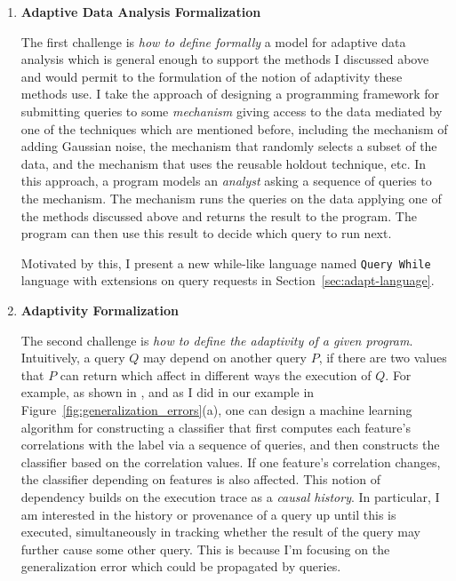 \begin{enumerate}
 \item
 \textbf{Adaptive Data Analysis Formalization}

The first challenge is \emph{how to define formally} a model for adaptive data analysis which is general enough to support the methods I discussed above and would permit to the formulation of the notion of adaptivity these methods use. 
I take the approach of designing a programming framework for submitting queries to some \emph{mechanism} giving access 
to the data mediated by one of the techniques which are mentioned before, 
including the mechanism of adding Gaussian noise, 
the mechanism that randomly selects a subset of the data, 
and the mechanism that uses the reusable holdout technique, etc. 
In this approach, a program models an \emph{analyst} asking a sequence of queries to the mechanism. 
The mechanism runs the queries on the data applying one of the methods discussed above and returns the result to the program. The program can then use this result to decide which query to run next. 

Motivated by this, I present a new while-like language 
named {\tt Query While} language with extensions on query requests in Section~\ref{sec:adapt-language}.

\item 
\textbf{Adaptivity Formalization}

The second challenge is \emph{how to define the adaptivity of a given program}.
Intuitively, a query $Q$ may depend on another query $P$, if there are two values that $P$ can return which affect in different ways the execution of $Q$. 
For example, as shown in \cite{stoc/DworkFHPRR15}, and as I did in our example in Figure~\ref{fig:generalization_errors}(a), one can design a machine learning algorithm for constructing a classifier that first computes each feature's correlations with the label via a sequence of queries, and then constructs the classifier based on the correlation values. 
If one feature's correlation changes, the classifier depending on features is also affected. 
This notion of dependency builds on the execution trace as a \emph{causal history}. 
In particular, I am interested in the history or provenance of a query up until this is executed, 
simultaneously in tracking whether the result of the query may further cause some other query. 
This is because I'm focusing on the generalization error which could be propagated by queries.


\end{enumerate}
